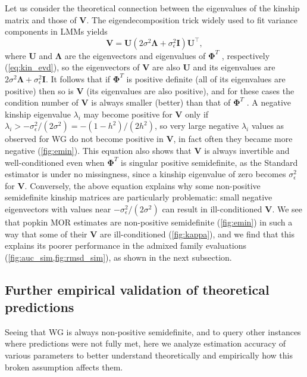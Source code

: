 \documentclass[11pt]{article}
\newcommand{\kinMat}[1][T]{%
  \ensuremath{%
    \mathbf{\Phi}^{#1}
  }%
  \xspace%
}%
\begin{document}
Let us consider the theoretical connection between the eigenvalues of the kinship matrix and those of $\mathbf{V}$.
The eigendecomposition trick widely used to fit variance components in LMMs \citep{kang_efficient_2008, lippert_fast_2011, svishcheva_rapid_2012, zhou_genome-wide_2012, sul_population_2018} yields
$$
\mathbf{V} = \mathbf{U} \left( 2 \sigma^2 \mathbf{\Lambda} + \sigma^2_\epsilon \mathbf{I} \right) \mathbf{U}^\intercal,
$$
where $\mathbf{U}$ and $\mathbf{\Lambda}$ are the eigenvectors and eigenvalues of \kinMat, respectively (\cref{eq:kin_evd}),
so the eigenvectors of $\mathbf{V}$ are also $\mathbf{U}$ and its eigenvalues are $2 \sigma^2 \mathbf{\Lambda} + \sigma^2_\epsilon \mathbf{I}$.
It follows that if \kinMat is positive definite (all of its eigenvalues are positive) then so is $\mathbf{V}$ (its eigenvalues are also positive), and for these cases the condition number of $\mathbf{V}$ is always smaller (better) than that of \kinMat.
A negative kinship eigenvalue $\lambda_i$ may become positive for $\mathbf{V}$ only if $\lambda_i  > -\sigma^2_\epsilon/(2\sigma^2) = -(1-h^2)/(2h^2)$, so very large negative $\lambda_i$ values as observed for WG do not become positive in $\mathbf{V}$, in fact often they became more negative (\cref{fig:emin}).
This equation also shows that $\mathbf{V}$ is always invertible and well-conditioned even when \kinMat is singular positive semidefinite, as the Standard estimator is under no missingness, since a kinship eigenvalue of zero becomes $\sigma^2_\epsilon$ for $\mathbf{V}$.
Conversely, the above equation explains why some non-positive semidefinite kinship matrices are particularly problematic: small negative eigenvectors with values near $-\sigma^2_\epsilon/(2\sigma^2)$ can result in ill-conditioned $\mathbf{V}$.
We see that popkin MOR estimates are non-positive semidefinite (\cref{fig:emin}) in such a way that some of their $\mathbf{V}$ are ill-conditioned (\cref{fig:kappa}), and we find that this explains its poorer performance in the admixed family evaluations (\cref{fig:auc_sim,fig:rmsd_sim}), as shown in the next subsection.

\subsection{Further empirical validation of theoretical predictions}

Seeing that WG is always non-positive semidefinite, and to query other instances where predictions were not fully met, here we analyze estimation accuracy of various parameters to better understand theoretically and empirically how this broken assumption affects them.
\end{document}
